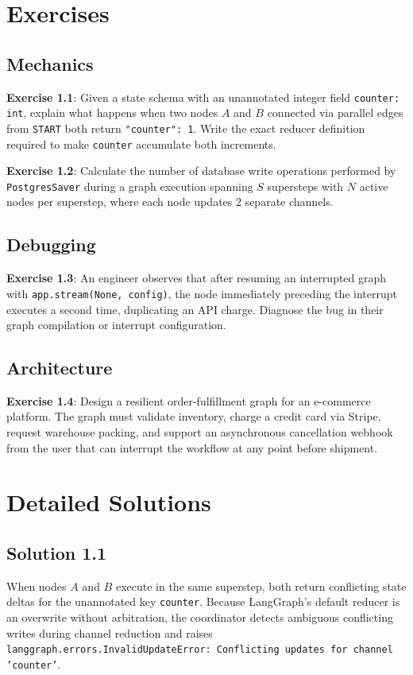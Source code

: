 \section{Exercises}

\subsection*{Mechanics}
\textbf{Exercise 1.1}: Given a state schema with an unannotated integer field \texttt{counter: int}, explain what happens when two nodes $A$ and $B$ connected via parallel edges from \texttt{START} both return \texttt{{"counter": 1}}. Write the exact reducer definition required to make \texttt{counter} accumulate both increments.

\textbf{Exercise 1.2}: Calculate the number of database write operations performed by \texttt{PostgresSaver} during a graph execution spanning $S$ supersteps with $N$ active nodes per superstep, where each node updates 2 separate channels.

\subsection*{Debugging}
\textbf{Exercise 1.3}: An engineer observes that after resuming an interrupted graph with \texttt{app.stream(None, config)}, the node immediately preceding the interrupt executes a second time, duplicating an API charge. Diagnose the bug in their graph compilation or interrupt configuration.

\subsection*{Architecture}
\textbf{Exercise 1.4}: Design a resilient order-fulfillment graph for an e-commerce platform. The graph must validate inventory, charge a credit card via Stripe, request warehouse packing, and support an asynchronous cancellation webhook from the user that can interrupt the workflow at any point before shipment.

\section{Detailed Solutions}

\subsection*{Solution 1.1}
When nodes $A$ and $B$ execute in the same superstep, both return conflicting state deltas for the unannotated key \texttt{counter}. Because LangGraph's default reducer is an overwrite without arbitration, the coordinator detects ambiguous conflicting writes during channel reduction and raises \texttt{langgraph.errors.InvalidUpdateError: Conflicting updates for channel 'counter'}.

